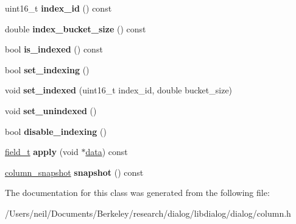 \begin{DoxyCompactItemize}
\item 
\mbox{\label{classdialog_1_1column__t_ac82b68223d597e807ac5bd4f5056b0c8}} 
uint16\+\_\+t {\bfseries index\+\_\+id} () const
\item 
\mbox{\label{classdialog_1_1column__t_aa43ce56355c469f098ebb2c5ee7d6ab9}} 
double {\bfseries index\+\_\+bucket\+\_\+size} () const
\item 
\mbox{\label{classdialog_1_1column__t_a61f7a157a27f4fa3d4a801db035e2166}} 
bool {\bfseries is\+\_\+indexed} () const
\item 
\mbox{\label{classdialog_1_1column__t_ab9651b430ffa98ff36af3c643c591576}} 
bool {\bfseries set\+\_\+indexing} ()
\item 
\mbox{\label{classdialog_1_1column__t_a18cbf15074f6255b63438bf64d6622bf}} 
void {\bfseries set\+\_\+indexed} (uint16\+\_\+t index\+\_\+id, double bucket\+\_\+size)
\item 
\mbox{\label{classdialog_1_1column__t_abd10df62173d46d9189306cca8569494}} 
void {\bfseries set\+\_\+unindexed} ()
\item 
\mbox{\label{classdialog_1_1column__t_ad9c14144d0ca7ae53f84f9c7fe222db9}} 
bool {\bfseries disable\+\_\+indexing} ()
\item 
\mbox{\label{classdialog_1_1column__t_a73c2aee9091311707673a244d05cc99e}} 
\hyperlink{structdialog_1_1field__t}{field\+\_\+t} {\bfseries apply} (void $\ast$\hyperlink{structdialog_1_1data}{data}) const
\item 
\mbox{\label{classdialog_1_1column__t_a74f17c57b3b6d9947d38a84c39590369}} 
\hyperlink{structdialog_1_1column__snapshot}{column\+\_\+snapshot} {\bfseries snapshot} () const
\end{DoxyCompactItemize}


The documentation for this class was generated from the following file\+:\begin{DoxyCompactItemize}
\item 
/\+Users/neil/\+Documents/\+Berkeley/research/dialog/libdialog/dialog/column.\+h\end{DoxyCompactItemize}
